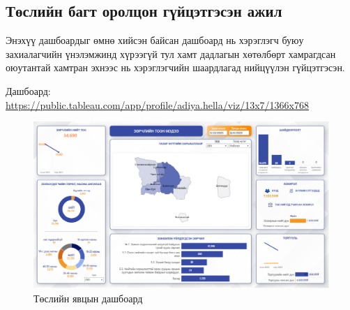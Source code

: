 \subsection{Төслийн багт оролцон гүйцэтгэсэн ажил}

Энэхүү дашбоардыг өмнө хийсэн байсан дашбоард нь хэрэглэгч буюу захиалагчийн үнэлэмжинд хүрээгүй тул хамт дадлагын хөтөлбөрт хамрагдсан оюутантай хамтран эхнээс нь хэрэглэгчийн шаардлагад нийцүүлэн гүйцэтгэсэн.


Дашбоард: \url{https://public.tableau.com/app/profile/adiya.hella/viz/13x7/1366x768}
\begin{figure}
	\centering
	\includegraphics[width=15cm]{images/dash2.PNG}
	\caption{Төслийн явцын дашбоард}
	\label{fig:form}
\end{figure}
